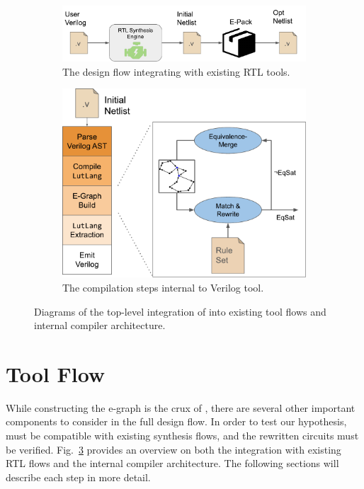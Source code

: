 \begin{figure}
    \begin{subfigure}{0.47\textwidth}
        \centering
        \includegraphics[width=\textwidth]{img/flow.pdf}
        \caption{The design flow integrating \shortname{} with existing RTL tools.}\label{fig:flow:rtl}
    \end{subfigure}
    \hfill\vspace{4mm}
    \begin{subfigure}{0.47\textwidth}
        \centering
        \includegraphics[width=\textwidth]{img/egraph.pdf}
        \caption{The compilation steps internal to \shortname{} Verilog tool.}\label{fig:flow:egraph}
    \end{subfigure}
    \caption{Diagrams of the top-level integration of \shortname{} into existing tool flows and internal compiler architecture.}\label{fig:flow}
\end{figure}

\section{Tool Flow}\label{sec:flow}

While constructing the e-graph is the crux of \shortname{}, there are several
other important components to consider in the full design flow. In order to
test our hypothesis, \shortname{} must be compatible with existing synthesis
flows, and the rewritten circuits must be verified. Fig.~\ref{fig:flow}
provides an overview on both the integration with existing RTL flows and the
internal compiler architecture. The following sections will describe each step
in more detail.

